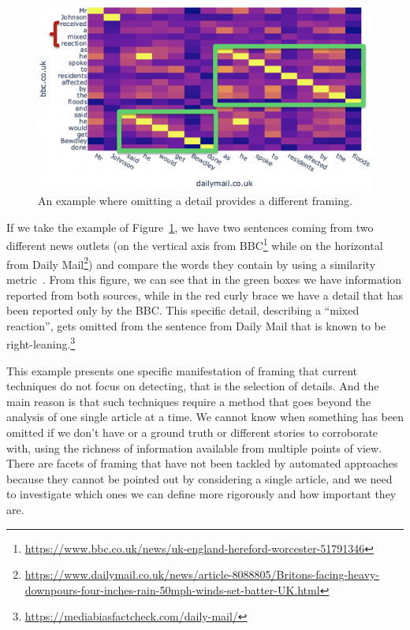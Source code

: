\begin{figure}[!htb]
    \centering
    \includegraphics[width=0.9\linewidth]{figures/johnson_flood.png}
    \caption{An example where omitting a detail provides a different framing.}
    \label{fig:johnson_flood}
\end{figure}

If we take the example of Figure~\ref{fig:johnson_flood}, we have two sentences coming from two different news outlets (on the vertical axis from BBC\footnote{\url{https://www.bbc.co.uk/news/uk-england-hereford-worcester-51791346}} while on the horizontal from Daily Mail\footnote{\url{https://www.dailymail.co.uk/news/article-8088805/Britons-facing-heavy-downpours-four-inches-rain-50mph-winds-set-batter-UK.html}}) and compare the words they contain by using a similarity metric~\cite{cer2018universal}.
From this figure, we can see that in the green boxes we have information reported from both sources, while in the red curly brace we have a detail that has been reported only by the BBC.
This specific detail, describing a ``mixed reaction'', gets omitted from the sentence from Daily Mail that is known to be right-leaning.\footnote{\url{https://mediabiasfactcheck.com/daily-mail/}}

This example presents one specific manifestation of framing that current techniques do not focus on detecting, that is the selection of details.
And the main reason is that such techniques require a method that goes beyond the analysis of one single article at a time.
We cannot know when something has been omitted if we don't have or a ground truth or different stories to corroborate with, using the richness of information available from multiple points of view.
There are facets of framing that have not been tackled by automated approaches because they cannot be pointed out by considering a single article, and we need to investigate which ones we can define more rigorously and how important they are.

